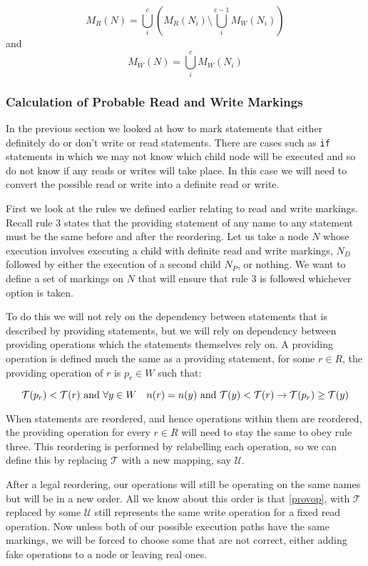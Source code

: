 \documentclass{report}
\begin{document}
$$M_R(N) = \bigcup_i^c (M_R(N_i) \setminus \bigcup_i^{c-1} M_W(N_i))$$
and
$$M_W(N) = \bigcup_i^c M_W(N_i)$$

\subsubsection{Calculation of Probable Read and Write Markings}

In the previous section we looked at how to mark statements that either definitely do or don't write or read statements. There are cases such as
\texttt{if} statements in which we may not know which child node will be executed and so do not know if any reads or writes will take place. In this
case we will need to convert the possible read or write into a definite read or write.

First we look at the rules we defined earlier relating to read and write markings. Recall rule 3 states that the providing statement of
any name to any statement must be the same before and after the reordering. Let us take a node $N$ whose execution involves executing a
child with definite read and write markings, $N_D$ followed by either the execution of a second child $N_P$, or nothing. We want to define
a set of markings on $N$ that will ensure that rule 3 is followed whichever option is taken.

To do this we will not rely on the dependency between statements that is described by providing statements, but we will rely on dependency
between providing operations which the statements themselves rely on. A providing operation is defined much the same as a providing statement,
for some $r \in R$, the providing operation of $r$ is $p_r \in W$ such that:

\begin{equation} \label{provop}
\mathcal{T}(p_r) < \mathcal{T}(r) \text{ and } \\
\forall y \in W \quad n(r) = n(y) \text{ and } \mathcal{T}(y) < \mathcal{T}(r) \rightarrow \mathcal{T}(p_r) \ge \mathcal{T}(y)
\end{equation}

When statements are reordered, and hence operations within them are reordered, the providing operation for every $r \in R$ will need to stay the same to
obey rule three. This reordering is performed by relabelling each operation, so we can define this by replacing $\mathcal{T}$ with a new mapping, say
$\mathcal{U}$.

After a legal reordering, our operations will still be operating on the same names but will be in a new order. All we know about this order is that
\eqref{provop}, with $\mathcal{T}$ replaced by some $\mathcal{U}$ still represents the same write operation for a fixed read operation. Now unless
both of our possible execution paths have the same markings, we will be forced to choose some that are not correct, either adding fake operations
to a node or leaving real ones.
\end{document}
